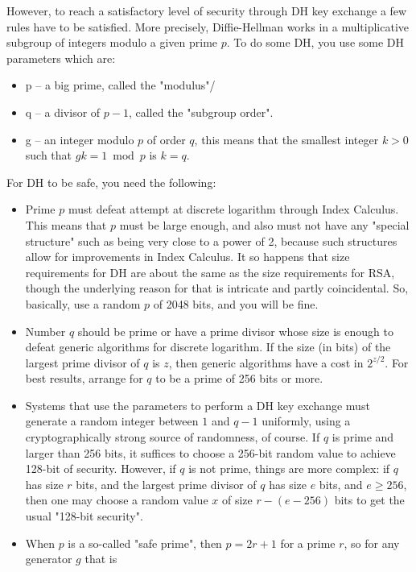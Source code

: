However, to reach a satisfactory level of security through DH key exchange a few rules have to be satisfied.
More precisely, Diffie-Hellman works in a multiplicative subgroup of integers modulo a given prime $p$.
To do some DH, you use some DH parameters which are:
\begin{itemize}
    \item p -- a big prime, called the "modulus"/
    \item q -- a divisor of $p-1$, called the "subgroup order".
    \item g -- an integer modulo $p$ of order $q$, this means that the smallest integer $k > 0$ such that
    $gk = 1 \bmod p$ is $k = q$.
\end{itemize}
For DH to be safe, you need the following:

\begin{itemize}
    \item Prime $p$ must defeat attempt at discrete logarithm through Index Calculus.
    This means that $p$ must be large enough, and also must not have any "special structure"
    such as being very close to a power of 2, because such structures allow for improvements in Index Calculus.
    It so happens that size requirements for DH are about the same as the size requirements for RSA,
    though the underlying reason for that is intricate and partly coincidental.
    So, basically, use a random $p$ of 2048 bits, and you will be fine.
    \item Number $q$ should be prime or have a prime divisor whose size is enough to defeat generic algorithms for
    discrete logarithm.
    If the size (in bits) of the largest prime divisor of $q$ is $z$, then generic algorithms have a cost in $2^{z/2}$.
    For best results, arrange for $q$ to be a prime of 256 bits or more.
    \item Systems that use the parameters to perform a DH key exchange must generate a random integer
    between $1$ and $q-1$ uniformly, using a cryptographically strong source of randomness, of course.
    If $q$ is prime and larger than 256 bits, it suffices to choose a 256-bit random value
    to achieve 128-bit of security.
    However, if $q$ is not prime, things are more complex: if $q$ has size $r$ bits,
    and the largest prime divisor of $q$ has size $e$ bits, and $e \geq 256$,
    then one may choose a random value $x$ of size $r-(e-256)$
    bits to get the usual "128-bit security".
    \item When $p$ is a so-called "safe prime", then $p = 2r+1$ for a prime $r$, so for any generator $g$ that is

\end{itemize}
